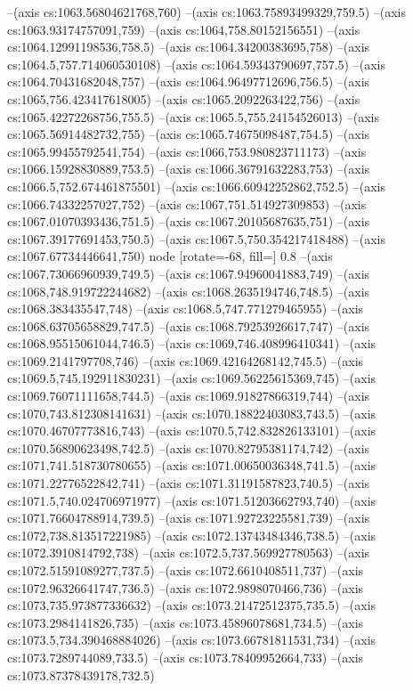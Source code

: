 --(axis cs:1063.56804621768,760)
--(axis cs:1063.75893499329,759.5)
--(axis cs:1063.93174757091,759)
--(axis cs:1064,758.80152156551)
--(axis cs:1064.12991198536,758.5)
--(axis cs:1064.34200383695,758)
--(axis cs:1064.5,757.714060530108)
--(axis cs:1064.59343790697,757.5)
--(axis cs:1064.70431682048,757)
--(axis cs:1064.96497712696,756.5)
--(axis cs:1065,756.423417618005)
--(axis cs:1065.2092263422,756)
--(axis cs:1065.42272268756,755.5)
--(axis cs:1065.5,755.24154526013)
--(axis cs:1065.56914482732,755)
--(axis cs:1065.74675098487,754.5)
--(axis cs:1065.99455792541,754)
--(axis cs:1066,753.980823711173)
--(axis cs:1066.15928830889,753.5)
--(axis cs:1066.36791632283,753)
--(axis cs:1066.5,752.674461875501)
--(axis cs:1066.60942252862,752.5)
--(axis cs:1066.74332257027,752)
--(axis cs:1067,751.514927309853)
--(axis cs:1067.01070393436,751.5)
--(axis cs:1067.20105687635,751)
--(axis cs:1067.39177691453,750.5)
--(axis cs:1067.5,750.354217418488)
--(axis cs:1067.67734446641,750) node [rotate=-68, fill=\bgcol] {0.8}
--(axis cs:1067.73066960939,749.5)
--(axis cs:1067.94960041883,749)
--(axis cs:1068,748.919722244682)
--(axis cs:1068.2635194746,748.5)
--(axis cs:1068.383435547,748)
--(axis cs:1068.5,747.771279465955)
--(axis cs:1068.63705658829,747.5)
--(axis cs:1068.79253926617,747)
--(axis cs:1068.95515061044,746.5)
--(axis cs:1069,746.408996410341)
--(axis cs:1069.2141797708,746)
--(axis cs:1069.42164268142,745.5)
--(axis cs:1069.5,745.192911830231)
--(axis cs:1069.56225615369,745)
--(axis cs:1069.76071111658,744.5)
--(axis cs:1069.91827866319,744)
--(axis cs:1070,743.812308141631)
--(axis cs:1070.18822403083,743.5)
--(axis cs:1070.46707773816,743)
--(axis cs:1070.5,742.832826133101)
--(axis cs:1070.56890623498,742.5)
--(axis cs:1070.82795381174,742)
--(axis cs:1071,741.518730780655)
--(axis cs:1071.00650036348,741.5)
--(axis cs:1071.22776522842,741)
--(axis cs:1071.31191587823,740.5)
--(axis cs:1071.5,740.024706971977)
--(axis cs:1071.51203662793,740)
--(axis cs:1071.76604788914,739.5)
--(axis cs:1071.92723225581,739)
--(axis cs:1072,738.813517221985)
--(axis cs:1072.13743484346,738.5)
--(axis cs:1072.3910814792,738)
--(axis cs:1072.5,737.569927780563)
--(axis cs:1072.51591089277,737.5)
--(axis cs:1072.6610408511,737)
--(axis cs:1072.96326641747,736.5)
--(axis cs:1072.9898070466,736)
--(axis cs:1073,735.973877336632)
--(axis cs:1073.21472512375,735.5)
--(axis cs:1073.2984141826,735)
--(axis cs:1073.45896078681,734.5)
--(axis cs:1073.5,734.390468884026)
--(axis cs:1073.66781811531,734)
--(axis cs:1073.7289744089,733.5)
--(axis cs:1073.78409952664,733)
--(axis cs:1073.87378439178,732.5)
